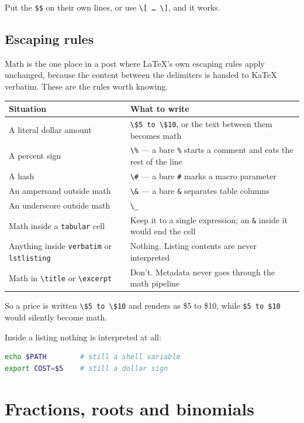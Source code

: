 Put the \texttt{\$\$} on their own lines, or use \texttt{\textbackslash{}[ … \textbackslash{}]}, and it works.

\subsection{Escaping rules}

Math is the one place in a post where LaTeX's own escaping rules apply unchanged, because the content between the delimiters is handed to KaTeX verbatim. These are the rules worth knowing.

\begin{tabular}{ll}
\hline
Situation & What to write \\
\hline
A literal dollar amount & \texttt{\textbackslash{}\$5 to \textbackslash{}\$10}, or the text between them becomes math \\
A percent sign & \texttt{\textbackslash{}\%} — a bare \texttt{\%} starts a comment and eats the rest of the line \\
A hash & \texttt{\textbackslash{}\#} — a bare \texttt{\#} marks a macro parameter \\
An ampersand outside math & \texttt{\textbackslash{}\&} — a bare \texttt{\&} separates table columns \\
An underscore outside math & \texttt{\textbackslash{}\_} \\
Math inside a \texttt{tabular} cell & Keep it to a single expression; an \texttt{\&} inside it would end the cell \\
Anything inside \texttt{verbatim} or \texttt{lstlisting} & Nothing. Listing contents are never interpreted \\
Math in \texttt{\textbackslash{}title} or \texttt{\textbackslash{}excerpt} & Don't. Metadata never goes through the math pipeline \\
\hline
\end{tabular}

So a price is written \texttt{\textbackslash{}\$5 to \textbackslash{}\$10} and renders as \$5 to \$10, while \texttt{\$5 to \$10} would silently become math.

Inside a listing nothing is interpreted at all:

\begin{lstlisting}[language=bash]
echo $PATH        # still a shell variable
export COST=$5    # still a dollar sign
\end{lstlisting}

\section{Fractions, roots and binomials}

